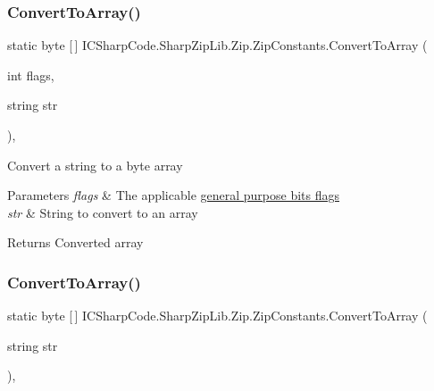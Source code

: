 \subsubsection{\texorpdfstring{Convert\+To\+Array()}{ConvertToArray()}\hspace{0.1cm}{\footnotesize\ttfamily [2/4]}}
{\footnotesize\ttfamily static byte \mbox{[}$\,$\mbox{]} I\+C\+Sharp\+Code.\+Sharp\+Zip\+Lib.\+Zip.\+Zip\+Constants.\+Convert\+To\+Array (\begin{DoxyParamCaption}\item[{int}]{flags,  }\item[{string}]{str }\end{DoxyParamCaption})\hspace{0.3cm}{\ttfamily [inline]}, {\ttfamily [static]}}



Convert a string to a byte array 


\begin{DoxyParams}{Parameters}
{\em flags} & The applicable \hyperlink{namespace_i_c_sharp_code_1_1_sharp_zip_lib_1_1_zip_aff75e20559fbf517bcd80eccbda53f19}{general purpose bits flags}\\
\hline
{\em str} & String to convert to an array \\
\hline
\end{DoxyParams}
\begin{DoxyReturn}{Returns}
Converted array
\end{DoxyReturn}
\mbox{\label{class_i_c_sharp_code_1_1_sharp_zip_lib_1_1_zip_1_1_zip_constants_a01022ba5b96baff1480a068a3368d9ea}} 
\subsubsection{\texorpdfstring{Convert\+To\+Array()}{ConvertToArray()}\hspace{0.1cm}{\footnotesize\ttfamily [3/4]}}
{\footnotesize\ttfamily static byte \mbox{[}$\,$\mbox{]} I\+C\+Sharp\+Code.\+Sharp\+Zip\+Lib.\+Zip.\+Zip\+Constants.\+Convert\+To\+Array (\begin{DoxyParamCaption}\item[{string}]{str }\end{DoxyParamCaption})\hspace{0.3cm}{\ttfamily [inline]}, {\ttfamily [static]}}



